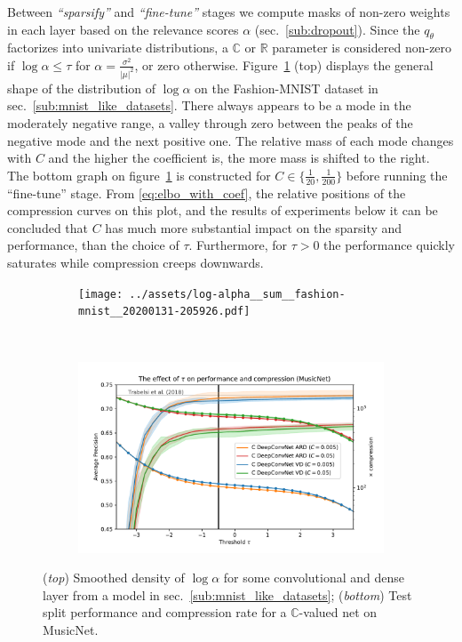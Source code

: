 \documentclass[a4paper,10pt]{article}
\newcommand{\real}{\mathbb{R}}
\newcommand{\cplx}{\mathbb{C}}
\begin{document}
Between \textit{``sparsify''} and \textit{``fine-tune''} stages we compute masks of non-zero
weights in each layer based on the relevance scores $\alpha$ (sec.~\ref{sub:dropout}). Since
the $q_\theta$ factorizes into univariate distributions, a $\cplx$ or $\real$ parameter is
considered non-zero if $\log \alpha \leq \tau$ for $
  \alpha = \tfrac{\sigma^2}{\lvert\mu\rvert^2}
$, or zero otherwise. Figure~\ref{fig:hist__and__threshold__tradeoff} (top) displays the
general shape of the distribution of $\log \alpha$ on the Fashion-MNIST dataset in
sec.~\ref{sub:mnist_like_datasets}. There always appears to be a mode in the moderately
negative range, a valley through zero between the peaks of the negative mode and the next
positive one. The relative mass of each mode changes with $C$ and the higher the coefficient
is, the more mass is shifted to the right.
%
The bottom graph on figure~\ref{fig:hist__and__threshold__tradeoff} is constructed
for $C \in \{\tfrac1{20}, \frac1{200}\}$ before running the ``fine-tune'' stage. From
\eqref{eq:elbo_with_coef}, the relative positions of the compression curves on this
plot, and the results of experiments below it can be concluded that $C$ has much more
substantial impact on the sparsity and performance, than the choice of $\tau$. Furthermore,
for $\tau > 0$ the performance quickly saturates while compression creeps downwards.

\begin{figure}[ht]
  \centering
  \begin{subfigure}[b]{0.95\textwidth}  %
    \centering
    \texttt{[image: ../assets/log-alpha\_\_sum\_\_fashion-mnist\_\_20200131-205926.pdf]}
  \end{subfigure} \\%
  \begin{subfigure}[b]{0.95\textwidth}  %
    \centering
    \includegraphics[width=\linewidth]{../assets/figure__musicnet__threshold.pdf}
  \end{subfigure}
  \caption{%
    (\textit{top}) Smoothed density of $\log\alpha$ for some convolutional and dense layer
    from a model in sec.~\ref{sub:mnist_like_datasets};
    (\textit{bottom}) Test split performance and compression rate for a $\cplx$-valued
    net on MusicNet.
  }
  \label{fig:hist__and__threshold__tradeoff}
\end{figure}
\end{document}
